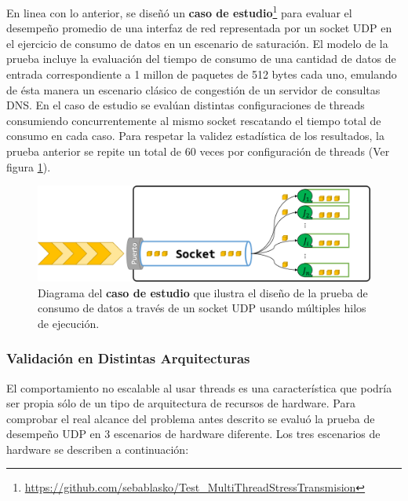 En linea con lo anterior, se diseñó un \textbf{caso de estudio}\footnote{\url{https://github.com/sebablasko/Test_MultiThreadStressTransmision}} para evaluar el desempeño promedio de una interfaz de red representada por un socket UDP en el ejercicio de consumo de datos en un escenario de saturación. El modelo de la prueba incluye la evaluación del tiempo de consumo de una cantidad de datos de entrada correspondiente a 1 millon de paquetes de 512 bytes cada uno, emulando de ésta manera un escenario clásico de congestión de un servidor de consultas DNS. En el caso de estudio se evalúan distintas configuraciones de threads consumiendo concurrentemente al mismo socket rescatando el tiempo total de consumo en cada caso. Para respetar la validez estadística de los resultados, la prueba anterior se repite un total de 60 veces por configuración de threads (Ver figura \ref{fig:testUDP}).

\begin{figure}[!h]
	\centering
	\includegraphics[scale=0.5]{imagenes/casoDeEstudio.png}
	\caption{Diagrama del \textbf{caso de estudio} que ilustra el diseño de la prueba de consumo de datos a través de un socket UDP usando múltiples hilos de ejecución.}
	\label{fig:testUDP}
\end{figure}

\subsubsection{Validación en Distintas Arquitecturas}

El comportamiento no escalable al usar threads es una característica que podría ser propia sólo de un tipo de arquitectura de recursos de hardware. Para comprobar el real alcance del problema antes descrito se evaluó la prueba de desempeño UDP en 3 escenarios de hardware diferente. Los tres escenarios de hardware se describen a continuación:

